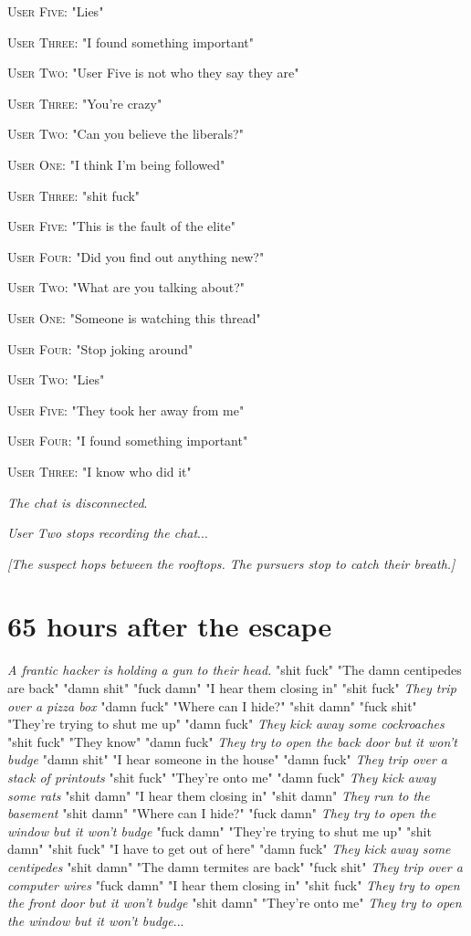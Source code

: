 \documentclass{report}
\begin{document}
\textsc{User Five}: "Lies" 

\textsc{User Three}: "I found something important" 

\textsc{User Two}: "User Five is not who they say they are" 

\textsc{User Three}: "You're crazy" 

\textsc{User Two}: "Can you believe the liberals?" 

\textsc{User One}: "I think I'm being followed" 

\textsc{User Three}: "shit fuck" 

\textsc{User Five}: "This is the fault of the elite" 

\textsc{User Four}: "Did you find out anything new?" 

\textsc{User Two}: "What are you talking about?" 

\textsc{User One}: "Someone is watching this thread" 

\textsc{User Four}: "Stop joking around" 

\textsc{User Two}: "Lies" 

\textsc{User Five}: "They took her away from me" 

\textsc{User Four}: "I found something important" 

\textsc{User Three}: "I know who did it" 

\textit{The chat is disconnected}. 

\textit{User Two stops recording the chat}...

\textit{[The suspect hops between the rooftops. The pursuers stop to catch their breath.]}


\section*{65 \small{hours after the escape}}

\textit{A frantic hacker is holding a gun to their head.} "shit fuck" "The damn centipedes are back" "damn shit" \textit{} "fuck damn" "I hear them closing in" "shit fuck" \textit{They trip over a pizza box} "damn fuck" "Where can I hide?" "shit damn" \textit{} "fuck shit" "They're trying to shut me up" "damn fuck" \textit{They kick away some cockroaches} "shit fuck" "They know" "damn fuck" \textit{They try to open the back door but it won't budge} "damn shit" "I hear someone in the house" "damn fuck" \textit{They trip over a stack of printouts} "shit fuck" "They're onto me" "damn fuck" \textit{They kick away some rats} "shit damn" "I hear them closing in" "shit damn" \textit{They run to the basement} "shit damn" "Where can I hide?" "fuck damn" \textit{They try to open the window but it won't budge} "fuck damn" "They're trying to shut me up" "shit damn" \textit{} "shit fuck" "I have to get out of here" "damn fuck" \textit{They kick away some centipedes} "shit damn" "The damn termites are back" "fuck shit" \textit{They trip over a computer wires} "fuck damn" "I hear them closing in" "shit fuck" \textit{They try to open the front door but it won't budge} "shit damn" "They're onto me" \textit{They try to open the window but it won't budge}...
\end{document}
